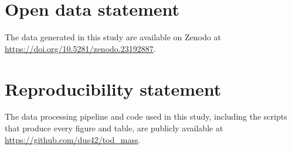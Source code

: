 \documentclass[
  manuscript=proceedings,  %
  layout=preprint,  %
  year=2026,
  volume=x,
]{extra/joas}
\begin{document}
\section*{Open data statement}
The data generated in this study are available on Zenodo at \url{https://doi.org/10.5281/zenodo.23192887}.

\section*{Reproducibility statement}
\label{reproducibility}
The data processing pipeline and code used in this study, including the scripts that produce every figure and table, are publicly available at \url{https://github.com/dus42/tod_mass}.

\printbibliography
\end{document}

